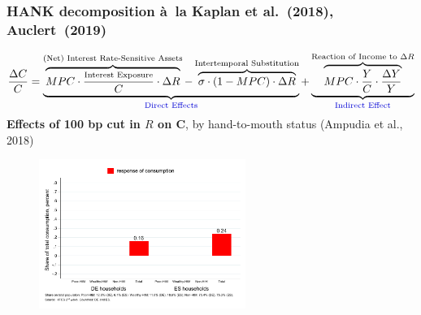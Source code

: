 \documentclass[pdflatex,aspectratio=169]{beamer}
\newcommand{\jemph}[1]{{\color{StataDarkBlue}#1}}
\newcommand{\jbemph}[1]{\textbf{\color{SlideNavy}#1}}
\begin{document}
\begin{frame}\frametitle{\bf HANK decomposition \`a\ la Kaplan et al.~(2018), Auclert~(2019)}
\vspace*{-2.5mm}
\footnotesize
$$
\frac{\Delta C}{C}=\underbrace{\overbrace{MPC\cdot\frac{\text{\scriptsize{Interest Exposure}}}{C}\cdot\Delta R}^{\text{(Net) Interest Rate-Sensitive Assets}}-\overbrace{\sigma\cdot(1-MPC)\cdot\Delta R}^{\text{Intertemporal Substitution}}}_{\text{\jemph{Direct Effects}}}+\underbrace{\overbrace{MPC\cdot\frac{Y}{C}\cdot\frac{\Delta Y}{Y}}^{\text{Reaction of Income to $\Delta R$}}}_{\text{\jemph{Indirect Effect}}}
$$
\small
\jbemph{Effects of 100 bp cut in $R$ on C}, by hand-to-mouth status (Ampudia et al., 2018)
\begin{figure}
\begin{center}
\includegraphics[width=0.6\textwidth]{./figures/cDecomp1.pdf}
\end{center}
\end{figure}
\end{frame}
\end{document}
